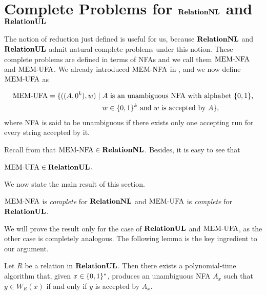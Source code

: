 \documentclass[11pt,twoside=off,numbers=noenddot]{scrbook}
\begin{document}
\section{Complete Problems for $\textbf{RelationNL}$ and $\textbf{RelationUL}$}
The notion of reduction just defined is useful for us, because $\textbf{RelationNL}$ and $\textbf{RelationUL}$ admit natural complete problems under this notion. These complete problems are defined in terms of NFAs and we call them $\text{MEM-NFA}$ and $\MEMUFA$. We already introduced $\text{MEM-NFA}$ in , and we now define $\MEMUFA$ as

\begin{definition}[$\MEMUFA$]
    \begin{align*}
        \text{MEM-UFA} = \{((A, 0^k), w) \mid & \ \text{$A$ is an unambiguous NFA with alphabet $\{ 0, 1 \}$,} \\
                                       & \ \text{$w \in \{ 0, 1 \}^k$ and $w$ is accepted by $A$}\},
    \end{align*}
    where NFA is said to be unambiguous if there exists only one accepting run for every string accepted by it.
\end{definition} 

Recall from  that $\text{MEM-NFA} \in \textbf{RelationNL}$. Besides, it is easy to see that

\begin{lemma}
    $\text{MEM-UFA} \in \textbf{RelationUL}$.
\end{lemma}

We now state the main result of this section.

\begin{proposition}
    $\text{MEM-NFA}$ is \emph{complete} for $\textbf{RelationNL}$ and $\MEMUFA$ is \emph{complete} for $\textbf{RelationUL}$.
\end{proposition}

We will prove the result only for the case of $\textbf{RelationUL}$ and $\MEMUFA$, as the other case is completely analogous. The following lemma is the key ingredient to our argument.

\begin{lemma}
    Let $R$ be a relation in $\textbf{RelationUL}$. Then there exists a polynomial-time algorithm that, given $x \in \{ 0, 1 \}^\ast$, produces an unambiguous NFA $A_x$ such that $y \in W_R(x)$ if and only if $y$ is accepted by $A_x$.
\end{lemma}
\end{document}
